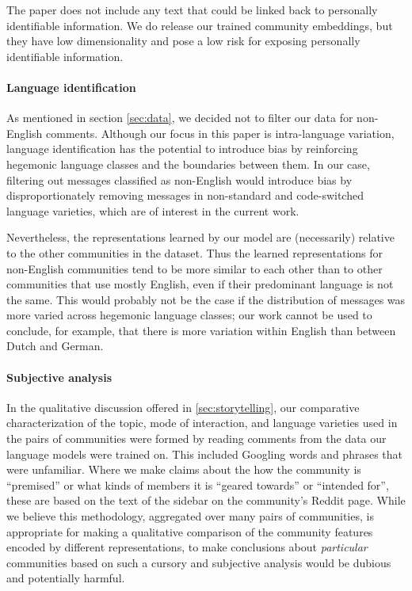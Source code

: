 \documentclass[11pt]{article}
\begin{document}
The paper does not include any text that could be linked back to 
personally identifiable information.
We do release our trained community embeddings, but they have 
low dimensionality and pose a low risk for exposing personally
identifiable information.

\paragraph{Language identification}
As mentioned in section \cref{sec:data}, we decided not to filter our data for non-English 
comments.
Although our focus in this paper is intra-language variation, 
language identification has the potential to introduce bias by reinforcing hegemonic
language classes and the boundaries between them.
In our case, filtering out messages classified as non-English would 
introduce bias by disproportionately removing messages in
non-standard and code-switched language varieties,
which are of interest in the current work.

Nevertheless, the representations learned by our model are (necessarily)
relative to the other communities in the dataset. 
Thus the learned representations for non-English communities tend to be more similar to each other 
than to other communities that use mostly English, even if their predominant language is not the same.
This would probably not be the case if the distribution of messages 
was more varied across hegemonic language classes; our work cannot be used to conclude,
for example, that there is more variation within English than between Dutch and German.

\paragraph{Subjective analysis}
In the qualitative discussion offered in \cref{sec:storytelling},
our comparative characterization of the topic, mode of interaction, 
and language varieties
used in the pairs of communities were formed by reading comments from the data our 
language models were trained on. This included Googling words and phrases that 
were unfamiliar. 
Where we make claims about the how the community is ``premised'' or what kinds of 
members it is ``geared towards'' or ``intended for'', these are based on the text
of the sidebar on the community's Reddit page.
While we believe this methodology, aggregated over many pairs of communities, 
is appropriate for making a qualitative comparison
of the community features encoded by different representations, 
to make conclusions about \emph{particular} communities based on such a cursory and
subjective analysis would be dubious and potentially harmful.





\end{document}
